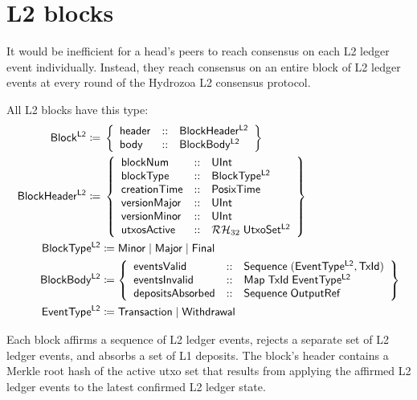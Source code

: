\documentclass[../hydrozoa.tex]{subfiles}
\begin{document}
\chapter{L2 blocks}%
\label{h:l2-blocks}%

It would be inefficient for a head's peers to reach consensus on each L2 ledger event individually.
Instead, they reach consensus on an entire block of L2 ledger events at every round of the Hydrozoa L2 consensus protocol.

All L2 blocks have this type:
\begin{equation*}
\begin{split}
  \mathsf{Block^{L2}} \coloneq&\; \left\{
    \begin{array}{lll}
      \mathsf{header} &::& \mathsf{BlockHeader^{L2}} \\
      \mathsf{body} &::& \mathsf{BlockBody^{L2}}
    \end{array}\right\} \\
  \mathsf{BlockHeader^{L2}} \coloneq&\; \left\{
    \begin{array}{lll}
      \mathsf{blockNum} &::& \mathsf{UInt} \\
      \mathsf{blockType} &::& \mathsf{BlockType^{L2}} \\
      \mathsf{creationTime} &::& \mathsf{PosixTime} \\
      \mathsf{versionMajor} &::& \mathsf{UInt} \\
      \mathsf{versionMinor} &::& \mathsf{UInt} \\
      \mathsf{utxosActive} &::& \mathcal{RH}_{32} \; \mathsf{UtxoSet^{L2}}
    \end{array}\right\} \\
  \mathsf{BlockType^{L2}} &\coloneq
    \mathsf{Minor} \mid
    \mathsf{Major} \mid
    \mathsf{Final} \\
  \mathsf{BlockBody^{L2}} &\coloneq \left\{
  \begin{array}{lll}
    \mathsf{eventsValid} &::&
      \mathsf{Sequence} \; (\mathsf{EventType^{L2}}, \mathsf{TxId}) \\
    \mathsf{eventsInvalid} &::&
      \mathsf{Map} \; \mathsf{TxId} \; \mathsf{EventType^{L2}} \\
    \mathsf{depositsAbsorbed} &::& \mathsf{Sequence} \; \mathsf{OutputRef}
  \end{array}\right\} \\
  \mathsf{EventType^{L2}} &\coloneq \mathsf{Transaction} \mid \mathsf{Withdrawal}
\end{split}
\end{equation*}

Each block affirms a sequence of L2 ledger events, rejects a separate set of L2 ledger events, and absorbs a set of L1 deposits.
The block's header contains a Merkle root hash of the active utxo set that results from applying the affirmed L2 ledger events to the latest confirmed L2 ledger state.
\end{document}
